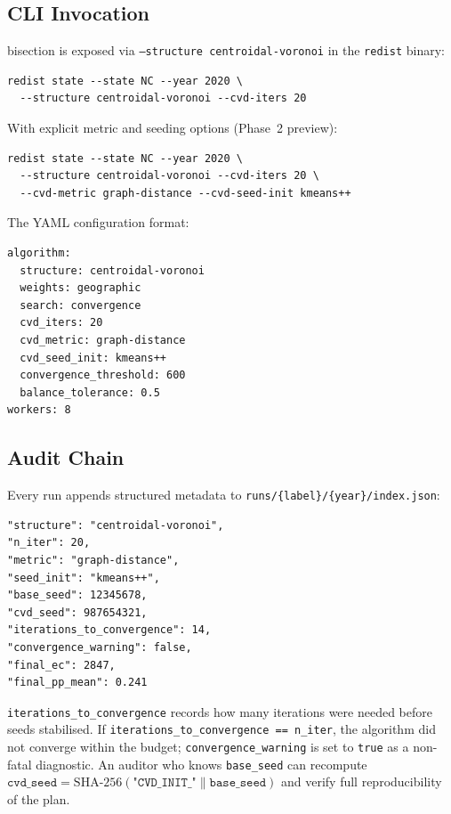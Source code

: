 \subsection{CLI Invocation}

\cvd{} bisection is exposed via \texttt{--structure centroidal-voronoi}
in the \texttt{redist} binary:

\begin{verbatim}
redist state --state NC --year 2020 \
  --structure centroidal-voronoi --cvd-iters 20
\end{verbatim}

With explicit metric and seeding options (Phase~2 preview):
\begin{verbatim}
redist state --state NC --year 2020 \
  --structure centroidal-voronoi --cvd-iters 20 \
  --cvd-metric graph-distance --cvd-seed-init kmeans++
\end{verbatim}

The YAML configuration format:
\begin{verbatim}
algorithm:
  structure: centroidal-voronoi
  weights: geographic
  search: convergence
  cvd_iters: 20
  cvd_metric: graph-distance
  cvd_seed_init: kmeans++
  convergence_threshold: 600
  balance_tolerance: 0.5
workers: 8
\end{verbatim}

\subsection{Audit Chain}

Every \cvd{} run appends structured metadata to
\texttt{runs/\{label\}/\{year\}/index.json}:

\begin{verbatim}
"structure": "centroidal-voronoi",
"n_iter": 20,
"metric": "graph-distance",
"seed_init": "kmeans++",
"base_seed": 12345678,
"cvd_seed": 987654321,
"iterations_to_convergence": 14,
"convergence_warning": false,
"final_ec": 2847,
"final_pp_mean": 0.241
\end{verbatim}

\texttt{iterations\_to\_convergence} records how many iterations were needed
before seeds stabilised.
If \texttt{iterations\_to\_convergence == n\_iter}, the algorithm did not
converge within the budget; \texttt{convergence\_warning} is set to
\texttt{true} as a non-fatal diagnostic.
An auditor who knows \texttt{base\_seed} can recompute
$\mathtt{cvd\_seed} = \mathrm{SHA\text{-}256}(\texttt{"CVD\_INIT\_"} \| \mathtt{base\_seed})$
and verify full reproducibility of the plan.

